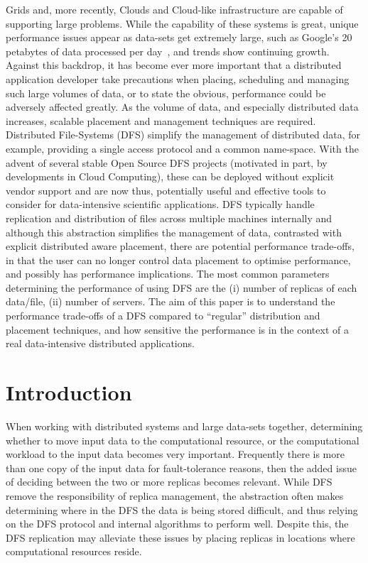 \documentclass[a4paper,11pt]{article} \pagestyle{empty} \usepackage{amssymb}
\begin{document}
Grids and, more recently, Clouds and Cloud-like infrastructure are capable of
supporting large problems. While the capability of these systems is great,
unique performance issues appear as data-sets get extremely large, such as
Google's 20 petabytes of data processed per day~\cite{google}, and trends show
continuing growth. Against this backdrop, it has become ever more important
that a distributed application developer take precautions when placing,
scheduling and managing such large volumes of data, or to state the obvious,
performance could be adversely affected greatly. As the volume of data, and
especially distributed data increases, scalable placement and management
techniques are required.  Distributed File-Systems (DFS) simplify the
management of distributed data, for example, providing a single access protocol
and a common name-space. With the advent of several stable Open Source DFS
projects (motivated in part, by developments in Cloud Computing), these can be
deployed without explicit vendor support and are now thus, potentially useful
and effective tools to consider for data-intensive scientific applications.
DFS typically handle replication and distribution of files across multiple
machines internally and although this abstraction simplifies the management of
data, contrasted with explicit distributed aware placement, there are potential
performance trade-offs, in that the user can no longer control data placement
to optimise performance, and possibly has performance implications.  The most
common parameters determining the performance of using DFS are the (i) number
of replicas of each data/file, (ii) number of servers. The aim of this paper is
to understand the performance trade-offs of a DFS compared to ``regular''
distribution and placement techniques, and how sensitive the performance is in
the context of a real data-intensive distributed applications.

\section{Introduction} When working with distributed systems and large
data-sets together, determining whether to move input data to the computational
resource, or the computational workload to the input data becomes very
important. Frequently there is more than one copy of the input data for
fault-tolerance reasons, then the added issue of deciding between the two or
more replicas becomes relevant. While DFS remove the responsibility of replica
management, the abstraction often makes determining where in the DFS the data
is being stored difficult, and thus relying on the DFS protocol and internal
algorithms to perform well. Despite this, the DFS replication may alleviate
these issues by placing replicas in locations where computational resources
reside.
\end{document}

